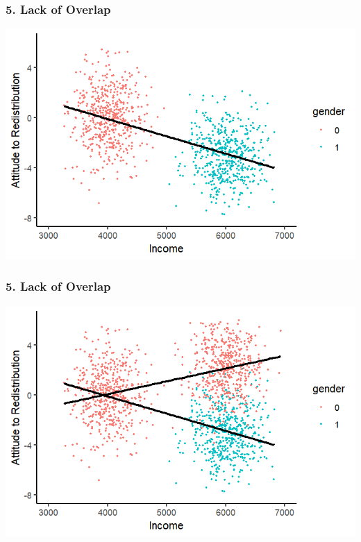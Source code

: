 \documentclass[xcolor=x11names,compress]{beamer}\usepackage[]{graphicx}\usepackage[]{color}
\makeatletter
\def\maxwidth{ %
  \ifdim\Gin@nat@width>\linewidth
    \linewidth
  \else
    \Gin@nat@width
  \fi
}
\newenvironment{knitrout}{}{} %
\renewcommand{\(}{\begin{columns}}
\renewcommand{\)}{\end{columns}}
\newcommand{\<}[1]{\begin{column}{#1}}
\renewcommand{\>}{\end{column}}
\makeatother
\begin{document}
\begin{frame}
\frametitle{5. Lack of Overlap}
\begin{knitrout}
\color{fgcolor}
\includegraphics[width=\maxwidth]{figure/overlap2-1} 

\end{knitrout}
\end{frame}

\begin{frame}
\frametitle{5. Lack of Overlap}
\begin{knitrout}
\color{fgcolor}
\includegraphics[width=\maxwidth]{figure/overlap3-1} 

\end{knitrout}
\end{frame}
\end{document}
